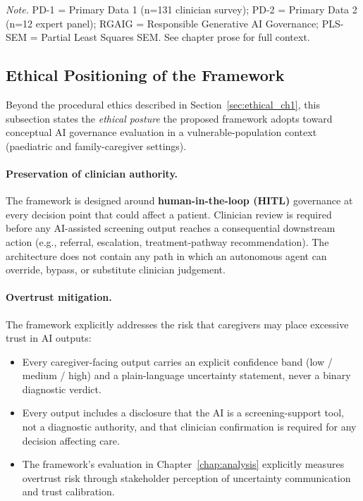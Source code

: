 \vspace{0.3em}\noindent\textit{Note.} PD-1 = Primary Data 1 (n=131 clinician survey); PD-2 = Primary Data 2 (n=12 expert panel); RGAIG = Responsible Generative AI Governance; PLS-SEM = Partial Least Squares SEM. See chapter prose for full context.

\subsection{Ethical Positioning of the Framework}
\label{sec:ethical_positioning}

Beyond the procedural ethics described in Section~\ref{sec:ethical_ch1}, this subsection states the \emph{ethical posture} the proposed framework adopts toward conceptual AI governance evaluation in a vulnerable-population context (paediatric and family-caregiver settings).

\paragraph{Preservation of clinician authority.} The framework is designed around \textbf{human-in-the-loop (HITL)} governance at every decision point that could affect a patient. Clinician review is required before any AI-assisted screening output reaches a consequential downstream action (e.g., referral, escalation, treatment-pathway recommendation). The architecture does not contain any path in which an autonomous agent can override, bypass, or substitute clinician judgement.

\paragraph{Overtrust mitigation.} The framework explicitly addresses the risk that caregivers may place excessive trust in AI outputs:
\begin{itemize}[leftmargin=*, itemsep=3pt]
    \item Every caregiver-facing output carries an explicit confidence band (low / medium / high) and a plain-language uncertainty statement, never a binary diagnostic verdict.
    \item Every output includes a disclosure that the AI is a screening-support tool, not a diagnostic authority, and that clinician confirmation is required for any decision affecting care.
    \item The framework's evaluation in Chapter~\ref{chap:analysis} explicitly measures overtrust risk through stakeholder perception of uncertainty communication and trust calibration.
\end{itemize}

